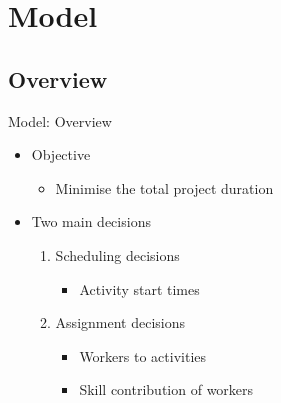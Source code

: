 \documentclass{beamer}
\begin{document}
\section{Model}
\subsection{Overview}
\begin{frame}{Model: Overview}
	\begin{itemize}
		\item \pause Objective\pause
		\begin{itemize}
			\item Minimise the total project duration\pause
		\end{itemize}
	\end{itemize}
	\vspace{5mm}
	\begin{itemize}
		\item Two main decisions\pause
		\vspace{2mm}
		\begin{enumerate}
			\item Scheduling decisions
			\begin{itemize}
				\item Activity start times\pause
			\end{itemize}
			\vspace{2mm}
			\item Assignment decisions
			\begin{itemize}
				\item Workers to activities
				\vspace{1mm}
				\item Skill contribution of workers
			\end{itemize}
		\end{enumerate}
	\end{itemize}
\end{frame}
\end{document}
